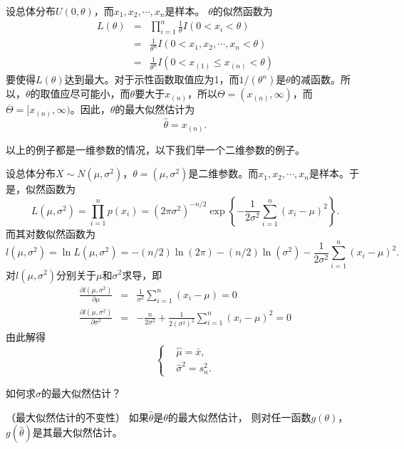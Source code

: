 \begin{example}
    设总体分布$U(0,\theta)$，而$x_1,x_2,\cdots,x_n$是样本。
    $\theta$的似然函数为
\begin{eqnarray*}
    L(\theta) &=& \prod_{i=1}^n \frac{1}{\theta} I(0 < x_i < \theta)\\
    &=&\frac{1}{\theta^n} I( 0 < x_1,x_2,\cdots,x_n < \theta)\\
    &=&\frac{1}{\theta^n} I( 0 < x_{(1)}\leq x_{(n)} < \theta)
\end{eqnarray*}
要使得$L(\theta)$达到最大。对于示性函数取值应为1，而$1/(\theta^n)$是$\theta$的减函数。所以，$\theta$的取值应尽可能小，而$\theta$要大于$x_{(n)}$，所以$\Theta = (x_{(n)},\infty)$，而$\overline{\Theta} = [x_{(n)},\infty)$。因此，$\theta$的最大似然估计为
$$
\hat{\theta} = x_{(n)}.
$$
\end{example}
以上的例子都是一维参数的情况，以下我们举一个二维参数的例子。
\begin{example}
设总体分布$X\sim N(\mu,\sigma^2)$，$\theta = (\mu,\sigma^2)$是二维参数。而$x_1,x_2,\cdots,x_n$是样本。于是，似然函数为
$$
L(\mu,\sigma^2) = \prod_{i=1}^n p(x_i) = (2\pi \sigma^2)^{-n/2} \exp\left\{ - \frac{1}{2\sigma^2} \sum_{i=1}^n (x_i-\mu)^2\right\}.
$$
而其对数似然函数为
$$
l(\mu,\sigma^2) = \ln L(\mu,\sigma^2) = -(n/2)\ln (2\pi ) - (n/2) \ln (\sigma^2) -  \frac{1}{2\sigma^2} \sum_{i=1}^n (x_i-\mu)^2.
$$
对$l(\mu,\sigma^2)$分别关于$\mu$和$\sigma^2$求导，即
\begin{eqnarray*}
    \frac{\partial l(\mu,\sigma^2)}{\partial \mu} &=& \frac{1}{\sigma^2} \sum_{i=1}^n (x_i - \mu)  = 0\\
    \frac{\partial l(\mu,\sigma^2)}{\partial \sigma^2} &=& -\frac{n}{2\sigma^2} + \frac{1}{2(\sigma^2)^2} \sum_{i=1}^n (x_i-\mu)^2 =0
\end{eqnarray*}
由此解得
$$
\left\{
\begin{aligned}
   & \hat{\mu} = \bar{x},\\
   & \hat{\sigma}^2 = s_n^2.
\end{aligned}
\right.
$$
\end{example}
\begin{problem}
    如何求$\sigma$的最大似然估计？
\end{problem}
    
\begin{property}{（最大似然估计的不变性）}
    如果$\hat{\theta}$是$\theta$的最大似然估计， 则对任一函数$g(\theta)$，$g(\hat{\theta})$是其最大似然估计。
\end{property}


